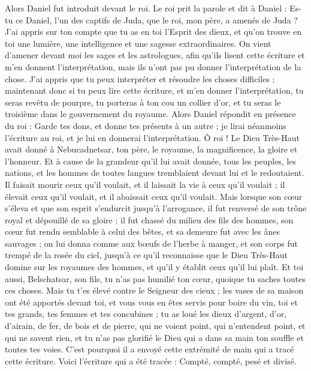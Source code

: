 \begin{multicols}{2}
Alors Daniel fut introduit devant le roi. Le roi prit la parole et dit à Daniel : Es-tu ce Daniel, l’un des captifs de Juda, que le roi, mon père, a amenés de Juda ?
J’ai appris sur ton compte que tu as en toi l'Esprit des dieux, et qu’on trouve en toi une lumière, une intelligence et une sagesse extraordinaires.
On vient d’amener devant moi les sages et les astrologues, afin qu'ils lisent cette écriture et m'en donnent l'interprétation, mais ils n’ont pas pu donner l'interprétation de la chose.
J’ai appris que tu peux interpréter et résoudre les choses difficiles ; maintenant donc si tu peux lire cette écriture, et m'en donner l'interprétation, tu seras revêtu de pourpre, tu porteras à ton cou un collier d'or, et tu seras le troisième dans le gouvernement du royaume.
Alors Daniel répondit en présence du roi : Garde tes dons, et donne tes présents à un autre ; je lirai néanmoins l'écriture au roi, et je lui en donnerai l'interprétation.
Ô roi ! Le Dieu Très-Haut avait donné à Nebucadnetsar, ton père, le royaume, la magnificence, la gloire et l'honneur.
Et à cause de la grandeur qu'il lui avait donnée, tous les peuples, les nations, et les hommes de toutes langues tremblaient devant lui et le redoutaient. Il faisait mourir ceux qu'il voulait, et il laissait la vie à ceux qu'il voulait ; il élevait ceux qu'il voulait, et il abaissait ceux qu'il voulait.
Mais lorsque son cœur s’éleva et que son esprit s’endurcit jusqu’à l’arrogance, il fut renversé de son trône royal et dépouillé de sa gloire ;
il fut chassé du milieu des fils des hommes, son cœur  fut rendu semblable à celui des bêtes, et sa demeure fut avec les ânes sauvages ; on lui donna comme aux bœufs de l'herbe à manger, et son corps fut trempé de la rosée du ciel, jusqu'à ce qu'il reconnaisse que le Dieu Très-Haut domine sur les royaumes des hommes, et qu'il y établit ceux qu'il lui plaît.
Et toi aussi, Belschatsar, son fils, tu n'as pas humilié ton cœur, quoique tu saches toutes ces choses.
Mais tu t'es élevé contre le Seigneur des cieux ; les vases de sa maison ont été apportés devant toi, et vous vous en êtes servis pour boire du vin, toi et tes grands, tes femmes et tes concubines ; tu as loué les dieux d'argent, d'or, d'airain, de fer, de bois et de pierre, qui ne voient point, qui n'entendent point, et qui ne savent rien, et tu n'as pas glorifié le Dieu qui a dans  sa main ton souffle et toutes tes voies.
C’est pourquoi il a envoyé cette extrémité de main qui a tracé cette écriture.
Voici l'écriture qui a été tracée : Compté, compté, pesé et divisé.

\end{multicols}
